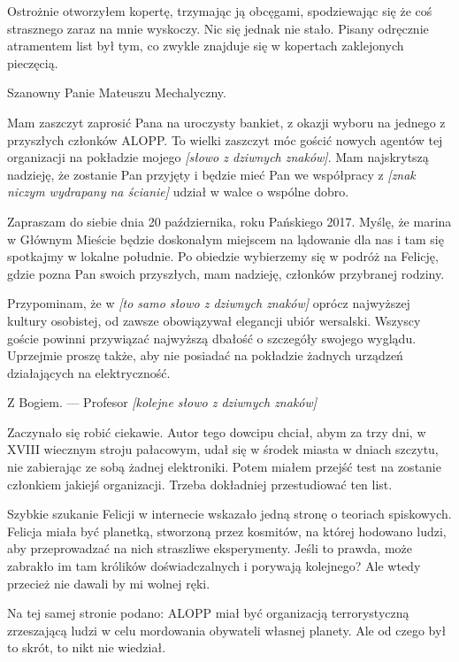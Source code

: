 Ostrożnie otworzyłem kopertę, trzymając ją obcęgami, spodziewając się że coś strasznego zaraz na mnie wyskoczy.
Nic się jednak nie stało.
Pisany odręcznie atramentem list był tym, co zwykle znajduje się w kopertach zaklejonych pieczęcią.

\begin{em}
Szanowny Panie Mateuszu Mechalyczny.

Mam zaszczyt zaprosić Pana na uroczysty bankiet, z okazji wyboru na jednego z przyszłych członków ALOPP.
To wielki zaszczyt móc gościć nowych agentów tej organizacji na pokładzie mojego \emph{[słowo z dziwnych znaków]}.
Mam najskrytszą nadzieję, że zostanie Pan przyjęty i będzie mieć Pan we współpracy z \emph{[znak niczym wydrapany na ścianie]} udział w walce o wspólne dobro.

Zapraszam do siebie dnia 20 października, roku Pańskiego 2017.
Myślę, że marina w Głównym Mieście będzie doskonałym miejscem na lądowanie dla nas i tam się spotkajmy w lokalne południe.
Po obiedzie wybierzemy się w podróż na Felicję, gdzie pozna Pan swoich przyszłych, mam nadzieję, członków przybranej rodziny.

Przypominam, że w \emph{[to samo słowo z dziwnych znaków]} oprócz najwyższej kultury osobistej,
od zawsze obowiązywał elegancji ubiór wersalski.
Wszyscy goście powinni przywiązać najwyższą dbałość o szczegóły swojego wyglądu.
Uprzejmie proszę także, aby nie posiadać na pokładzie żadnych urządzeń działających na elektryczność.

Z Bogiem.
--- Profesor \emph{[kolejne słowo z dziwnych znaków]}
\end{em}

Zaczynało się robić ciekawie. Autor tego dowcipu chciał, abym za trzy dni, w XVIII wiecznym stroju pałacowym,
udał się w środek miasta w dniach szczytu, nie zabierając ze sobą żadnej elektroniki.
Potem miałem przejść test na zostanie członkiem jakiejś organizacji.
Trzeba dokładniej przestudiować ten list.

Szybkie szukanie Felicji w internecie wskazało jedną stronę o teoriach spiskowych.
Felicja miała być planetką, stworzoną przez kosmitów, na której hodowano ludzi, aby przeprowadzać na nich straszliwe eksperymenty.
Jeśli to prawda, może zabrakło im tam królików doświadczalnych i porywają kolejnego? 
Ale wtedy przecież nie dawali by mi wolnej ręki.

Na tej samej stronie podano: ALOPP miał być organizacją terrorystyczną zrzeszającą ludzi w celu mordowania obywateli własnej planety.
Ale od czego był to skrót, to nikt nie wiedział.

